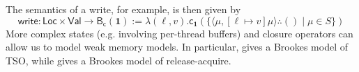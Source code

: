 \documentclass[acmsmall,screen,anonymous,review]{acmart}
\newcommand{\mb}[1]{\ensuremath{\mathbf{#1}}}
\newcommand{\ms}[1]{\ensuremath{\mathsf{#1}}}
\newcommand{\tret}[2]{#1 \therefore #2}
\begin{document}
The semantics of a write, for example, is then given by
\begin{equation*}
  \ms{write} : \ms{Loc} \times \ms{Val} \to \ms{B}_{\ms{c}}(\mb{1})
  := \lambda (\ell, v) . 
    \ms{c}_{\mb{1}}(\{\tret{\langle \mu, [\ell \mapsto v]\mu \rangle}{()} \mid \mu \in S\})
\end{equation*}
More complex states (e.g. involving per-thread buffers) and closure operators can allow us to model
weak memory models. In particular, \citet{jagadeesan-brookes-relaxed-12} gives a Brookes model of
TSO, while \citet{release-acquire} gives a Brookes model of release-acquire.
\end{document}
